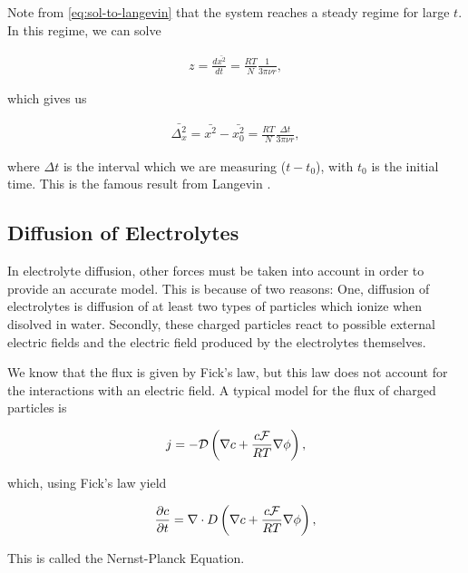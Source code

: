 Note from \ref{eq:sol-to-langevin} that the system reaches a steady regime for large $t$. In this regime, we can solve

\begin{align}
	z = \frac{d \bar{x^2}}{dt} =  \frac{RT}{N}\frac{1}{3\pi\nu r},
\end{align}

which gives us

\begin{align}
	\bar{\Delta_x^2} = \bar{x^2} - \bar{x_0^2} =  \frac{RT}{N}\frac{\Delta t}{3\pi\nu r},
\end{align}

where $\Delta t$ is the interval which we are measuring ($t-t_0$), with $t_0$ is the initial time. This is the famous result from Langevin \cite{langevin_original}.











\subsection{Diffusion of Electrolytes}

In electrolyte diffusion, other forces must be taken into account in order to provide an accurate model. This is because of two reasons: One, diffusion of electrolytes is diffusion of at least two types of particles which ionize when disolved in water. Secondly, these charged particles react to possible external electric fields and the electric field produced by the electrolytes themselves.

We know that the flux is given by Fick's law, but this law does not account for the interactions with an electric field. A typical model for the flux of charged particles is

\begin{align}
	j= -\mathcal{D}\left({\nabla c + \frac{c \mathcal{F}}{RT}\nabla \phi}\right),
\end{align}

which, using Fick's law yield


\begin{align}
\label{eq:nernst-planck}
	\frac{\partial c}{\partial t}= \nabla \cdot D\left({\nabla c + \frac{c \mathcal{F}}{RT}\nabla \phi}\right),
\end{align}


This is called the Nernst-Planck Equation.

